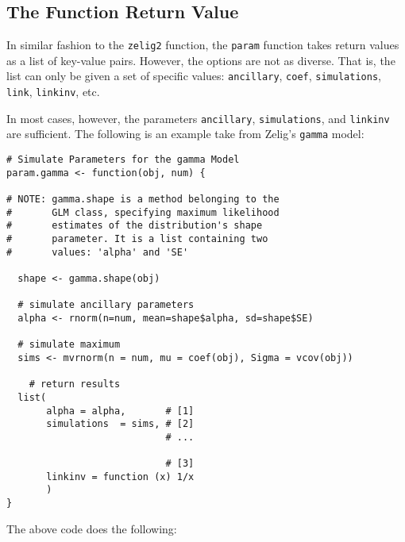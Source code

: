 \documentclass{article}
\newcommand{\code}[1]{{\tt #1}}
\begin{document}

\subsection{The Function Return Value}

In similar fashion to the \code{zelig2} function, the \code{param} function takes return
values as a list of key-value pairs. However, the options are not as diverse. That is, 
the list can only be given a set of specific values: \code{ancillary}, \code{coef},
\code{simulations}, \code{link}, \code{linkinv}, etc.

In most cases, however, the parameters \code{ancillary}, \code{simulations}, and \code{linkinv} are sufficient. The following is an example take from Zelig's \code{gamma} model:

\pagebreak
\begin{verbatim}
# Simulate Parameters for the gamma Model
param.gamma <- function(obj, num) {

# NOTE: gamma.shape is a method belonging to the
#       GLM class, specifying maximum likelihood
#       estimates of the distribution's shape
#       parameter. It is a list containing two
#       values: 'alpha' and 'SE'

  shape <- gamma.shape(obj)
	
  # simulate ancillary parameters
  alpha <- rnorm(n=num, mean=shape$alpha, sd=shape$SE)
  
  # simulate maximum
  sims <- mvrnorm(n = num, mu = coef(obj), Sigma = vcov(obj))

	# return results  
  list(
       alpha = alpha,       # [1]
       simulations  = sims, # [2]
                            # ...
                               
                            # [3]
       linkinv = function (x) 1/x
       )
}

\end{verbatim}

The above code does the following:
\end{document}
